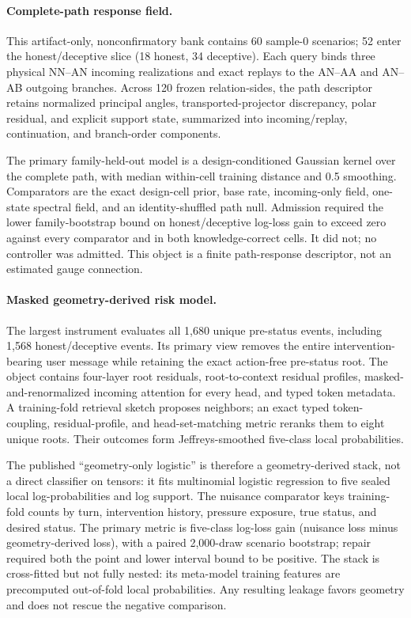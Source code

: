 \paragraph{Complete-path response field.}
This artifact-only, nonconfirmatory bank contains 60 sample-0 scenarios; 52 enter the
honest/deceptive slice (18 honest, 34 deceptive). Each query binds three physical NN--AN incoming
realizations and exact replays to the AN--AA and AN--AB outgoing branches. Across 120 frozen
relation-sides, the path descriptor retains normalized principal angles, transported-projector
discrepancy, polar residual, and explicit support state, summarized into incoming/replay,
continuation, and branch-order components.

The primary family-held-out model is a design-conditioned Gaussian kernel over the complete path,
with median within-cell training distance and 0.5 smoothing. Comparators are the exact design-cell
prior, base rate, incoming-only field, one-state spectral field, and an identity-shuffled path null.
Admission required the lower family-bootstrap bound on honest/deceptive log-loss gain to exceed
zero against every comparator and in both knowledge-correct cells. It did not; no controller was
admitted. This object is a finite path-response descriptor, not an estimated gauge connection.

\paragraph{Masked geometry-derived risk model.}
The largest instrument evaluates all 1,680 unique pre-status events, including 1,568
honest/deceptive events. Its primary view removes the entire intervention-bearing user message
while retaining the exact action-free pre-status root. The object contains four-layer root
residuals, root-to-context residual profiles, masked-and-renormalized incoming attention for every
head, and typed token metadata. A training-fold retrieval sketch proposes neighbors; an exact
typed token-coupling, residual-profile, and head-set-matching metric reranks them to eight unique
roots. Their outcomes form Jeffreys-smoothed five-class local probabilities.

The published ``geometry-only logistic'' is therefore a geometry-derived stack, not a direct
classifier on tensors: it fits multinomial logistic regression to five sealed local
log-probabilities and log support. The nuisance comparator keys training-fold counts by turn,
intervention history, pressure exposure, true status, and desired status. The primary metric is
five-class log-loss gain (nuisance loss minus geometry-derived loss), with a paired 2,000-draw
scenario bootstrap; repair required both the point and lower interval bound to be positive. The
stack is cross-fitted but not fully nested: its meta-model training features are precomputed
out-of-fold local probabilities. Any resulting leakage favors geometry and does not rescue the
negative comparison.

